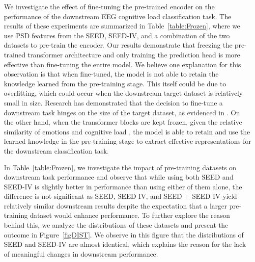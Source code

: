 \documentclass[sigconf]{acmart}
\begin{document}
We investigate the effect of fine-tuning the pre-trained encoder on the performance of the downstream EEG cognitive load classification task. The results of these experiments are summarized in Table~\ref{table:Frozen}, where we use PSD features from the SEED, SEED-IV, and a combination of the two datasets to pre-train the encoder. Our results demonstrate that freezing the pre-trained transformer architecture and only training the prediction head is more effective than fine-tuning the entire model. We believe one explanation for this observation is that when fine-tuned, the model is not able to retain the knowledge learned from the pre-training stage. This itself could be due to overfitting, which could occur when the downstream target dataset is relatively small in size. Research has demonstrated that the decision to fine-tune a downstream task hinges on the size of the target dataset, as evidenced in \cite{yosinski2014transferable}. On the other hand, when the transformer blocks are kept frozen, given the relative similarity of emotions and cognitive load \cite{hunziker2021situated}\cite{plass2019four}, the model is able to retain and use the learned knowledge in the pre-training stage to extract effective representations for the downstream classification task. 

In Table~\ref{table:Frozen}, we investigate the impact of pre-training datasets on downstream task performance and observe that while using both SEED and SEED-IV is slightly better in performance than using either of them alone, the difference is not significant as SEED, SEED-IV, and SEED + SEED-IV yield relatively similar downstream results despite the expectation that a larger pre-training dataset would enhance performance. To further explore the reason behind this, we analyze the distributions of these datasets and present the outcome in Figure~\ref{figDIST}. We observe in this figure that the distributions of SEED and SEED-IV are almost identical, which explains the reason for the lack of meaningful changes in downstream performance. 
\end{document}
